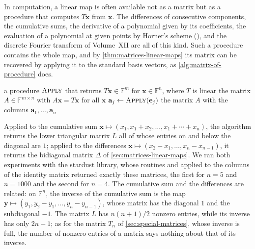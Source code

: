 In computation, a linear map is often available not as a matrix but as a procedure that computes $T\mathbf x$ from $\mathbf x$. The differences of consecutive components, the cumulative sums, the derivative of a polynomial given by its coefficients, the evaluation of a polynomial at given points by Horner's scheme (), and the discrete Fourier transform of Volume~XII are all of this kind. Such a procedure contains the whole map, and by \cref{thm:matrices-linear-maps} its matrix can be recovered by applying it to the standard basis vectors, as \cref{alg:matrix-of-procedure} does.

\begin{algorithm}
\begin{algorithmic}[1]
\Require a procedure $\textsc{Apply}$ that returns $T\mathbf x\in\mathbb F^m$ for $\mathbf x\in\mathbb F^n$, where $T$ is linear
\Ensure the matrix $A\in\mathbb F^{m\times n}$ with $A\mathbf x=T\mathbf x$ for all $\mathbf x$
  \State $\mathbf a_j\gets\textsc{Apply}(\mathbf e_j)$ 
\EndFor
\State \Return the matrix $A$ with the columns $\mathbf a_1,\ldots,\mathbf a_n$
\end{algorithmic}
\caption{The matrix of a linear map given by a procedure (\cref{thm:matrices-linear-maps}). It calls the procedure $n$ times, so it costs $n$ times the cost of one application, and it stores $mn$ numbers.}
\label{alg:matrix-of-procedure}
\end{algorithm}

Applied to the cumulative sum $\mathbf x\mapsto(x_1,x_1+x_2,\ldots,x_1+\cdots+x_n)$, the algorithm returns the lower triangular matrix $L$ all of whose entries on and below the diagonal are $1$; applied to the differences $\mathbf x\mapsto(x_2-x_1,\ldots,x_n-x_{n-1})$, it returns the bidiagonal matrix $\Delta$ of \cref{sec:matrices-linear-maps}. We ran both experiments with the stardust library, whose routines  and  applied to the columns of the identity matrix returned exactly these matrices, the first for $n=5$ and $n=1000$ and the second for $n=4$. The cumulative sum and the differences are related: on $\mathbb F^n$, the inverse of the cumulative sum is the map $\mathbf y\mapsto(y_1,y_2-y_1,\ldots,y_n-y_{n-1})$, whose matrix has the diagonal $1$ and the subdiagonal $-1$. The matrix $L$ has $n(n+1)/2$ nonzero entries, while its inverse has only $2n-1$; as for the matrix $T_n$ of \cref{sec:special-matrices}, whose inverse is full, the number of nonzero entries of a matrix says nothing about that of its inverse.

